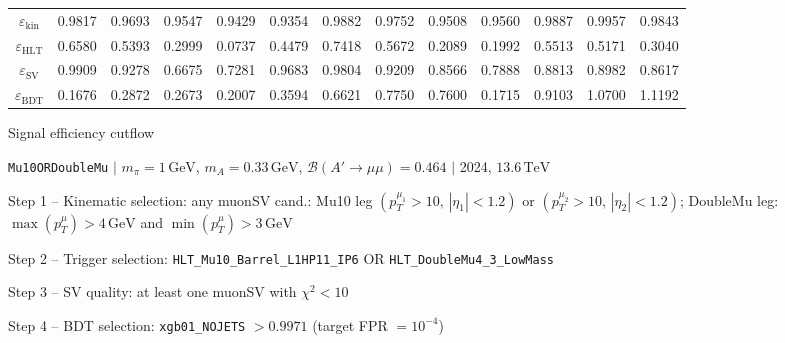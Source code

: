 \documentclass[10pt,a4paper]{article}
\begin{document}
\begin{landscape}
{\begin{tabular}{c|cccc|cccc|cccc}
\midrule
$\varepsilon_{\mathrm{kin}}$ & 0.9817 & 0.9693 & 0.9547 & 0.9429 & 0.9354 & 0.9882 & 0.9752 & 0.9508 & 0.9560 & 0.9887 & 0.9957 & 0.9843\\
$\varepsilon_{\mathrm{HLT}}$ & 0.6580 & 0.5393 & 0.2999 & 0.0737 & 0.4479 & 0.7418 & 0.5672 & 0.2089 & 0.1992 & 0.5513 & 0.5171 & 0.3040\\
$\varepsilon_{\mathrm{SV}}$ & 0.9909 & 0.9278 & 0.6675 & 0.7281 & 0.9683 & 0.9804 & 0.9209 & 0.8566 & 0.7888 & 0.8813 & 0.8982 & 0.8617\\
$\varepsilon_{\mathrm{BDT}}$ & 0.1676 & 0.2872 & 0.2673 & 0.2007 & 0.3594 & 0.6621 & 0.7750 & 0.7600 & 0.1715 & 0.9103 & 1.0700 & 1.1192\\
\bottomrule
\end{tabular}}

\end{landscape}
\clearpage

{\large Signal efficiency cutflow

 \texttt{Mu10ORDoubleMu} $|$ $m_{\pi}=1\,\mathrm{GeV}$, $m_{A}=0.33\,\mathrm{GeV}$, $\mathcal{B}(A'\!\to\!\mu\mu)=0.464$ $|$ 2024, $13.6\,\mathrm{TeV}$}

\vspace{0.8em}

Step 1 -- Kinematic selection: any muonSV cand.: Mu10 leg $(p_T^{\mu_1}{>}10,\,|\eta_1|{<}1.2)$ or $(p_T^{\mu_2}{>}10,\,|\eta_2|{<}1.2)$; DoubleMu leg: $\max(p_T^{\mu}){>}4\,\mathrm{GeV}$ and $\min(p_T^{\mu}){>}3\,\mathrm{GeV}$

Step 2 -- Trigger selection: \texttt{HLT\_Mu10\_Barrel\_L1HP11\_IP6} OR \texttt{HLT\_DoubleMu4\_3\_LowMass}

Step 3 -- SV quality: at least one muonSV with $\chi^2<10$

Step 4 -- BDT selection: \texttt{xgb01\_NOJETS} $>0.9971$ (target FPR $=10^{-4}$)

\vspace{0.8em}
\end{document}
